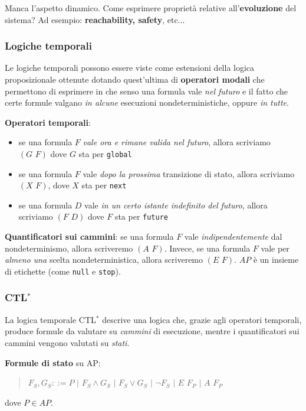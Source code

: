 \documentclass{article}
\begin{document}
\bigskip

Manca l'aspetto dinamico. Come esprimere proprietà relative all'\textbf{evoluzione} del sistema? Ad esempio: \textbf{reachability, safety}, etc...

\subsubsection{Logiche temporali}
Le logiche temporali possono essere viste come estensioni della logica proposizionale ottenute dotando quest'ultima di \textbf{operatori modali} che permettono di esprimere in che senso una formula vale \textit{nel futuro} e il fatto che certe formule valgano \textit{in alcune} esecuzioni nondeterministiche, oppure \textit{in tutte}.

\bigskip

\textbf{Operatori temporali}:
\begin{itemize}
    \item se una formula $F$ \textit{vale ora e rimane valida nel futuro}, allora scriviamo $(G\,\,F)$ dove $G$ sta per \verb|global|
    \item se una formula $F$ vale \textit{dopo la prossima} transizione di stato, allora scriviamo $(X\,\,F)$, dove $X$ sta per \verb|next|
    \item se una formula $D$ vale \textit{in un certo istante indefinito del futuro}, allora scriviamo $(F\,\,D)$ dove $F$ sta per \verb|future| 
\end{itemize}

\bigskip

\textbf{Quantificatori sui cammini}:  se una formula $F$ vale \textit{indipendentemente} dal nondeterminismo, allora scriveremo $(A\,\,F)$. Invece, se una formula $F$ vale per \textit{almeno una} scelta nondeterministica, allora scriveremo $(E\,\,F)$. $AP$ è un insieme di etichette (come \verb|null| e \verb|stop|).

\subsubsection{CTL$^*$}
La logica temporale CTL$^*$ descrive una logica che, grazie agli operatori temporali, produce formule da valutare su \textit{cammini} di esecuzione, mentre i quantificatori sui cammini vengono valutati su \textit{stati}.

\bigskip

\textbf{Formule di stato} su AP:
\begin{quote}
    $F_S,G_S::=P\,\,|\,\,F_S\land G_S\,\,|\,\,F_S\lor G_S\,\,|\,\,\lnot F_S\,\,|\,\,E\,\,F_P\,\,|\,\,A\,\,F_P$
\end{quote}
dove $P\in AP$.
\end{document}
